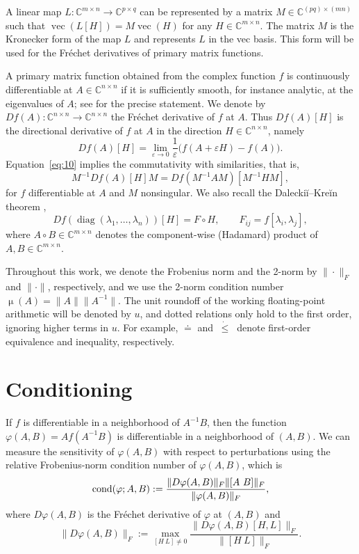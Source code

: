 \documentclass[DIV=14]{scrartcl}
\newcommand\ledot{~\dot{\le}~}
\newcommand{\C}{\ensuremath{\mathbb C}}
\newcommand{\Cnn}{\ensuremath{\C^{n \times n}}}
\newcommand{\Cmn}{\ensuremath{\C^{m \times n}}}
\newcommand{\Cpq}{\ensuremath{\C^{p \times q}}}
\theoremstyle{thmstyletwo}
\theoremstyle{definition}
\numberwithin{equation}{section}
\DeclareMathOperator{\diag}{diag}
\DeclareMathOperator{\opvec}{vec}
\newcommand{\deq}{\ensuremath{:=}}
\DeclareMathOperator{\cond}{\mu}
\newcommand{\D}[2]{D#1(#2)}
\newcommand{\Df}[3]{D#1(#2)[#3]}
\begin{document}
A linear map $L:\Cmn \rightarrow \Cpq$ can be represented by a matrix $M\in\mathbb C^{(pq)\times (mn)}$ such that $\opvec(L[H])=M\opvec(H)$ for any $H\in\Cmn$. The matrix
$M$ is the Kronecker form of the map $L$ and represents $L$ in the vec basis.
This form will be used for the Fréchet derivatives of primary matrix functions.

A primary matrix function obtained from the complex function $f$ is continuously differentiable at $A\in\Cnn$ if it is sufficiently smooth, for instance analytic, at the eigenvalues of $A$; see \cite[Thm.~3.8]{higham:book08} for the precise statement. We denote by $\D{f}{A} : \Cnn \rightarrow \Cnn$ the Fréchet derivative of $f$ at $A$. Thus $\Df{f}{A}{H}$ is the directional derivative of $f$ at $A$ in the direction $H \in \Cnn$, namely
\begin{equation}\label{eq:10}
\Df{f}{A}{H} = \lim_{\varepsilon\rightarrow 0} \frac{1}{\varepsilon}\bigl(f(A+\varepsilon H)-f(A)\bigr).
\end{equation}
Equation~\eqref{eq:10} implies the commutativity with similarities, that is,
\begin{equation}\label{eq:8}
    M^{-1}\Df{f}{A}{H}M=\Df{f}{M^{-1}AM}{M^{-1}HM},
\end{equation}
for $f$ differentiable at $A$ and $M$ nonsingular. We also recall the Daleckiĭ--Kreĭn theorem \cite[Thm.~3.11]{higham:book08},
\begin{equation}\label{eq:9}
    \Df{f}{\diag(\lambda_1,\ldots,\lambda_n)}{H} = F\circ H,\qquad F_{ij}=f[\lambda_i,\lambda_j],
\end{equation}
where $A\circ B \in \Cmn$ denotes the component-wise (Hadamard) product of $A, B \in \Cmn$.

Throughout this work, we denote the Frobenius norm and the 2-norm by $\| \cdot \|_F$ and $\| \cdot \|$, respectively, and we use the 2-norm condition number $\cond(A) = \|A\| \|A^{-1}\|$.
The unit roundoff of the working floating-point arithmetic will be denoted by $u$, and dotted relations only hold to the first order, ignoring higher terms in $u$. For example, $\doteq$ and $\ledot$ denote first-order equivalence and inequality, respectively.

\section{Conditioning}
\label{sec:conditioning}

If $f$ is differentiable in a neighborhood of $A^{-1}B$, then the function $\varphi(A,B)=Af(A^{-1}B)$ is differentiable in a neighborhood of $(A,B)$. We can measure the sensitivity of $\varphi(A,B)$ with respect to perturbations using the relative Frobenius-norm condition number \cite{rice} of $\varphi(A,B)$, which is
\begin{equation}\label{eq:4}
    \hbox{cond}(\varphi;A,B)\deq{}\frac{\|\D{\varphi}{A,B}\|_F\|[A\ B]\|_F}{\|\varphi(A,B)\|_F},
\end{equation}
where $\D{\varphi}{A,B}$ is the Fréchet derivative of $\varphi$ at $(A,B)$ and
\[
    \|D\varphi(A,B)\|_F\deq{}\max_{[H\ L]\ne 0}\frac{\|\Df{\varphi}{A,B}{H,L}\|_F}{\|[H\ L]\|_F}.
\]
\end{document}
